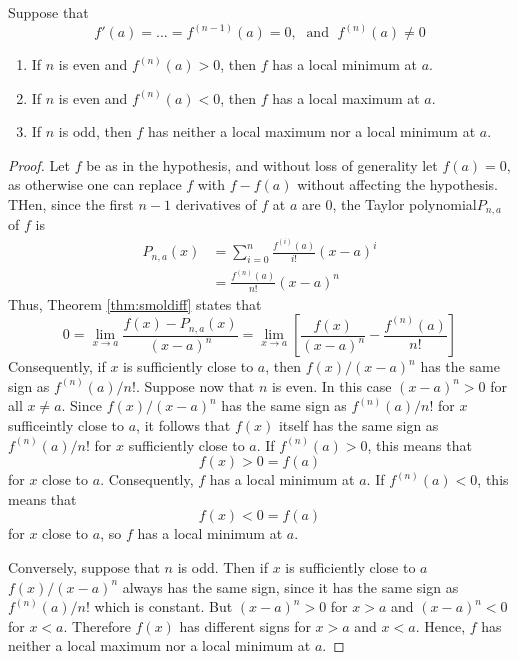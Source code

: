 \documentclass[12pt, a4paper, oneside, openright, titlepage]{book}
\begin{document}
\begin{thm}
    Suppose that \begin{equation*}
        f'(a) = ... = f^{(n-1)}(a) = 0,\;\text{ and }\;f^{(n)}(a) \neq 0
    \end{equation*}
    \begin{enumerate}
        \item If $n$ is even and $f^{(n)}(a) > 0$, then $f$ has a local minimum at $a$.
        \item If $n$ is even and $f^{(n)}(a) < 0$, then $f$ has a local maximum at $a$.
        \item If $n$ is odd, then $f$ has neither a local maximum nor a local minimum at $a$.
    \end{enumerate}
\end{thm}
\begin{proof}
    Let $f$ be as in the hypothesis, and without loss of generality let $f(a) = 0$, as otherwise one can replace $f$ with $f-f(a)$ without affecting the hypothesis. THen, since the first $n-1$ derivatives of $f$ at $a$ are $0$, the Taylor polynomial$ P_{n,a}$ of $f$ is \begin{align*}
        P_{n,a}(x) &= \sum\limits_{i=0}^n\frac{f^{(i)}(a)}{i!}(x-a)^i \\
        &= \frac{f^{(n)}(a)}{n!}(x-a)^n 
    \end{align*}
    Thus, Theorem \ref{thm:smoldiff} states that \begin{equation*}
        0 = \lim\limits_{x\rightarrow a} \frac{f(x) - P_{n,a}(x)}{(x-a)^n} = \lim\limits_{x\rightarrow a} \left[\frac{f(x)}{(x-a)^n} - \frac{f^{(n)}(a)}{n!}\right]
    \end{equation*}
    Consequently, if $x$ is sufficiently close to $a$, then $f(x)/(x-a)^n$ has the same sign as $f^{(n)}(a)/n!$. Suppose now that $n$ is even. In this case $(x-a)^n > 0$ for all $x \neq a$. Since $f(x)/(x-a)^n$ has the same sign as $f^{(n)}(a)/n!$ for $x$ sufficeintly close to $a$, it follows that $f(x)$ itself has the same sign as $f^{(n)}(a)/n!$ for $x$ sufficiently close to $a$. If $f^{(n)}(a) > 0$, this means that \begin{equation*}
        f(x) > 0 = f(a)
    \end{equation*}
    for $x$ close to $a$. Consequently, $f$ has a local minimum at $a$. If $f^{(n)}(a) < 0$, this means that \begin{equation*}
        f(x) < 0 = f(a)
    \end{equation*}
    for $x$ close to $a$, so $f$ has a local minimum at $a$.

    Conversely, suppose that $n$ is odd. Then if $x$ is sufficiently close to $a$ $f(x)/(x-a)^n$ always has the same sign, since it has the same sign as $f^{(n)}(a)/n!$ which is constant. But $(x-a)^n >0$ for $x >a$ and $(x-a)^n < 0$ for $x < a$. Therefore $f(x)$ has different signs for $x > a$ and $x <a$. Hence, $f$ has neither a local maximum nor a local minimum at $a$.
\end{proof}
\end{document}
